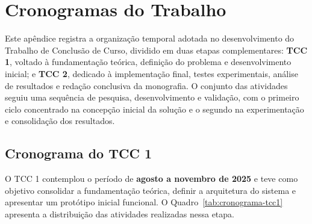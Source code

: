 \chapter{Cronogramas do Trabalho}
\label{ap:cronogramas}

Este apêndice registra a organização temporal adotada no desenvolvimento do Trabalho de Conclusão de Curso, dividido em duas etapas complementares: \textbf{TCC 1}, voltado à fundamentação teórica, definição do problema e desenvolvimento inicial; e \textbf{TCC 2}, dedicado à implementação final, testes experimentais, análise de resultados e redação conclusiva da monografia.
O conjunto das atividades seguiu uma sequência de pesquisa, desenvolvimento e validação, com o primeiro ciclo concentrado na concepção inicial da solução e o segundo na experimentação e consolidação dos resultados.

\section{Cronograma do TCC 1}

O TCC 1 contemplou o período de \textbf{agosto a novembro de 2025} e teve como objetivo consolidar a fundamentação teórica, definir a arquitetura do sistema e apresentar um protótipo inicial funcional.
O Quadro~\ref{tab:cronograma-tcc1} apresenta a distribuição das atividades realizadas nessa etapa.

